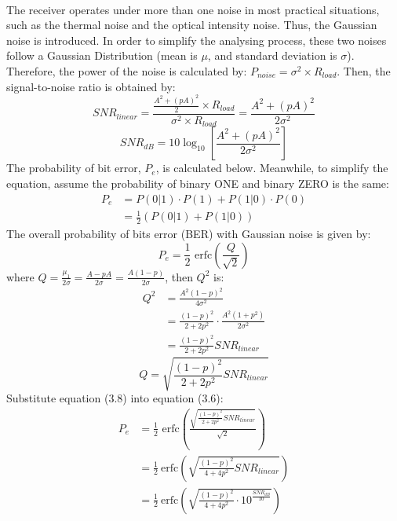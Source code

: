 \documentclass[12pt]{article}
\begin{document}
    \paragraph{}
    The receiver operates under more than one noise in most practical situations, such as the thermal noise and the optical intensity noise. Thus, the Gaussian noise is introduced. In order to simplify the analysing process, these two noises follow a Gaussian Distribution (mean is $\mu$, and standard deviation is $\sigma$). Therefore, the power of the noise is calculated by: $P_{noise}=\sigma^2 \times R_{load}$. Then, the signal-to-noise ratio is obtained by:
    \begin{equation}
        SNR_{linear}=\frac{\frac{A^2+(pA)^2}{2}\times R_{load}}{\sigma^2 \times R_{load}} = \frac{A^2+(pA)^2}{2\sigma^2}
    \end{equation}
    \begin{equation}
        SNR_{dB}=10\log_{10}[\frac{A^2+(pA)^2}{2\sigma^2}]
    \end{equation}
    The probability of bit error, $P_e$, is calculated below. Meanwhile, to simplify the equation, assume the probability of binary ONE and binary ZERO is the same:
    \begin{align}
        P_e &= P(0|1) \cdot P(1) + P(1|0) \cdot P(0)\\
        &=\frac{1}{2} (P(0|1) + P(1|0))
    \end{align}
    The overall probability of bits error (BER) with Gaussian noise is given by:
    \begin{equation}
         P_e = \frac{1}{2} \mbox{ erfc}\left( \frac{Q}{\sqrt{2}} \right)
    \end{equation}
    where $Q=\frac{\mu_1}{2\sigma}=\frac{A-pA}{2\sigma}=\frac{A(1-p)}{2\sigma}$, then $Q^2$ is:
    \begin{align}
        Q^2 &= \frac{A^2(1 - p)^2}{4 \sigma^2}\\ &=\frac{(1 - p)^2}{2 + 2p^2} \cdot\frac{A^2(1 + p^2)}{2 \sigma^2}\\ &=\frac{(1 - p)^2}{2 + 2p^2}SNR_{linear}
    \end{align}
    \begin{equation}
        Q=\sqrt{\frac{(1 - p)^2}{2 + 2p^2}SNR_{linear}}
    \end{equation}
    Substitute equation (3.8) into equation (3.6):
    \begin{align}
        P_e &= \frac{1}{2} \mbox{ erfc}\left( \frac{\sqrt{\frac{(1 - p)^2}{2 + 2p^2}SNR_{linear}}}{\sqrt{2}} \right)\\&=\frac{1}{2} \ \mbox{erfc} \left( \sqrt{\frac{(1 - p)^2}{4 + 4p^2}SNR_{linear}} \right)\\ &=\frac{1}{2} \ \mbox{erfc} \left( \sqrt{\frac{(1 - p)^2}{4 + 4p^2}\cdot10^{\frac{SNR_{dB}}{10}}} \right)
    \end{align}
\end{document}
